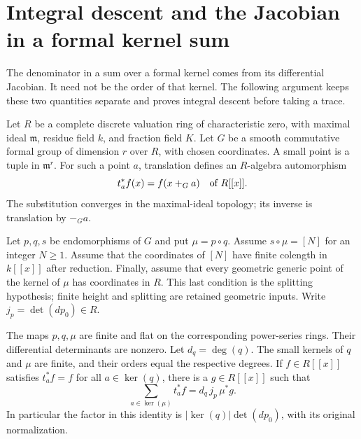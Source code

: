 \section{Integral descent and the Jacobian in a formal kernel sum}
\label{sec:geometry-formal-trace}

The denominator in a sum over a formal kernel comes from its differential
Jacobian.  It need not be the order of that kernel.  The following argument
keeps these two quantities separate and proves integral descent before
taking a trace.

Let $R$ be a complete discrete valuation ring of characteristic zero,
with maximal ideal $\mathfrak m$, residue field $k$, and fraction field
$K$.  Let $G$ be a smooth commutative formal group of dimension $r$ over
$R$, with chosen coordinates.  A small point is a tuple in $\mathfrak m^r$.
For such a point $a$, translation defines an $R$-algebra automorphism
\[
            t_a^*f(x)=f(x+_G a)\quad\hbox{of }R[[x]].
\]
The substitution converges in the maximal-ideal topology; its inverse is
translation by $-_G a$.

Let $p,q,s$ be endomorphisms of $G$ and put $\mu=p\circ q$.
Assume $s\circ\mu=[N]$ for an integer $N\geq1$.  Assume that the
coordinates of $[N]$ have finite colength in $k[[x]]$ after reduction.
Finally, assume that every geometric generic point of the kernel of
$\mu$ has coordinates in $R$.  This last condition is the splitting
hypothesis; finite height and splitting are retained geometric inputs.
Write $j_p=\det(dp_0)\in R$.

\begin{theorem}\label{thm:formal-kernel-jacobian-trace}
The maps $p,q,\mu$ are finite and flat on the corresponding power-series
rings.  Their differential determinants are nonzero.  Let
$d_q=\deg(q)$.  The small kernels of $q$ and $\mu$ are finite, and their
orders equal the respective degrees.  If $f\in R[[x]]$ satisfies
$t_a^*f=f$ for all $a\in\ker(q)$, there is a $g\in R[[x]]$ such that
\begin{equation}\label{eq:formal-kernel-exact-factor}
       \sum_{a\in\ker(\mu)}t_a^*f
                    =d_q\,j_p\,\mu^*g.
\end{equation}
In particular the factor in this identity is
$|\ker(q)|\det(dp_0)$, with its original normalization.
\end{theorem}

